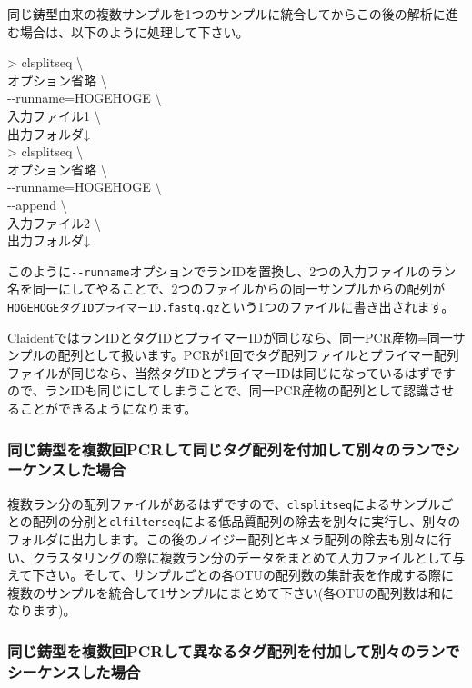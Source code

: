 \documentclass[titlepage,10pt,a4paper]{jsbook}
\newenvironment{cmd}{\begin{oframed}\raggedright\ttfamily\footnotesize\setlength{\baselineskip}{1.4em}}{\end{oframed}\vspace{-1em}}
\begin{document}
同じ鋳型由来の複数サンプルを1つのサンプルに統合してからこの後の解析に進む場合は、以下のように処理して下さい。
\begin{cmd}
{\textgreater} clsplitseq {\textbackslash}\\
オプション省略 {\textbackslash}\\
{-}{-}runname=HOGEHOGE {\textbackslash}\\
入力ファイル1 {\textbackslash}\\
出力フォルダ↓\\
{\textgreater} clsplitseq {\textbackslash}\\
オプション省略 {\textbackslash}\\
{-}{-}runname=HOGEHOGE {\textbackslash}\\
{-}{-}append {\textbackslash}\\
入力ファイル2 {\textbackslash}\\
出力フォルダ↓
\end{cmd}
このように\texttt{{-}{-}runname}オプションでランIDを置換し、2つの入力ファイルのラン名を同一にしてやることで、2つのファイルからの同一サンプルからの配列が\texttt{HOGEHOGE{\textunderscore}{\textunderscore}タグID{\textunderscore}{\textunderscore}プライマーID.fastq.gz}という1つのファイルに書き出されます。

ClaidentではランIDとタグIDとプライマーIDが同じなら、同一PCR産物=同一サンプルの配列として扱います。PCRが1回でタグ配列ファイルとプライマー配列ファイルが同じなら、当然タグIDとプライマーIDは同じになっているはずですので、ランIDも同じにしてしまうことで、同一PCR産物の配列として認識させることができるようになります。

\subsubsection{同じ鋳型を複数回PCRして同じタグ配列を付加して別々のランでシーケンスした場合}

複数ラン分の配列ファイルがあるはずですので、\texttt{clsplitseq}によるサンプルごとの配列の分別と\texttt{clfilterseq}による低品質配列の除去を別々に実行し、別々のフォルダに出力します。この後のノイジー配列とキメラ配列の除去も別々に行い、クラスタリングの際に複数ラン分のデータをまとめて入力ファイルとして与えて下さい。そして、サンプルごとの各OTUの配列数の集計表を作成する際に複数のサンプルを統合して1サンプルにまとめて下さい(各OTUの配列数は和になります)。

\subsubsection{同じ鋳型を複数回PCRして異なるタグ配列を付加して別々のランでシーケンスした場合}
\end{document}
